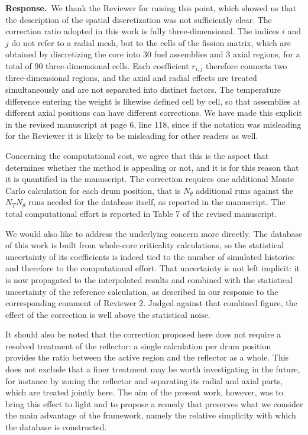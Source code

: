 \documentclass[11pt]{article}
\newcommand{\answer}{\textbf{Response.}\ }
\begin{document}
\answer We thank the Reviewer for raising this point, which showed us that the description of the spatial discretization was not sufficiently clear. The correction ratio adopted in this work is fully three-dimensional. The indices $i$ and $j$ do not refer to a radial mesh, but to the cells of the fission matrix, which are obtained by discretizing the core into 30 fuel assemblies and 3 axial regions, for a total of 90 three-dimensional cells. Each coefficient $r_{i,j}$ therefore connects two three-dimensional regions, and the axial and radial effects are treated simultaneously and are not separated into distinct factors. The temperature difference entering the weight is likewise defined cell by cell, so that assemblies at different axial positions can have different corrections. We have made this explicit in the revised manuscript at page 6, line 118, since if the notation was misleading for the Reviewer it is likely to be misleading for other readers as well.

Concerning the computational cost, we agree that this is the aspect that determines whether the method is appealing or not, and it is for this reason that it is quantified in the manuscript. The correction requires one additional Monte Carlo calculation for each drum position, that is $N_\theta$ additional runs against the $N_T N_\theta$ runs needed for the database itself, as reported in the manuscript. The total computational effort is reported in Table 7 of the revised manuscript.

We would also like to address the underlying concern more directly. The database of this work is built from whole-core criticality calculations, so the statistical uncertainty of its coefficients is indeed tied to the number of simulated histories and therefore to the computational effort. That uncertainty is not left implicit: it is now propagated to the interpolated results and combined with the statistical uncertainty of the reference calculation, as described in our response to the corresponding comment of Reviewer 2. Judged against that combined figure, the effect of the correction is well above the statistical noise.

It should also be noted that the correction proposed here does not require a resolved treatment of the reflector: a single calculation per drum position provides the ratio between the active region and the reflector as a whole. This does not exclude that a finer treatment may be worth investigating in the future, for instance by zoning the reflector and separating its radial and axial parts, which are treated jointly here. The aim of the present work, however, was to bring this effect to light and to propose a remedy that preserves what we consider the main advantage of the framework, namely the relative simplicity with which the database is constructed.
\end{document}
